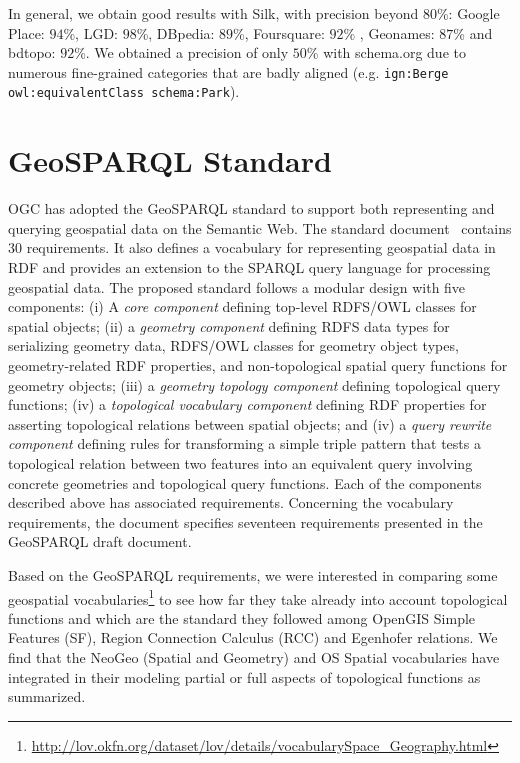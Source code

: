 \documentclass[a4paper,11pt]{report}
\begin{document}
In general, we obtain good results with Silk, with precision beyond $80$\%: Google Place: $94$\%, LGD: $98$\%, DBpedia: $89$\%, Foursquare: $92$\% , Geonames: $87$\% and bdtopo: $92$\%. We obtained a precision of only $50$\% with schema.org due to numerous fine-grained categories that are badly aligned (e.g. \texttt{ign:Berge owl:equivalentClass schema:Park}).



\section{GeoSPARQL Standard}
OGC has adopted the GeoSPARQL standard to support both representing and querying geospatial data on the Semantic Web. The standard document~\cite{ogc2012} contains 30 requirements. It also defines a vocabulary for representing geospatial data in RDF and provides an extension to the SPARQL query language for processing geospatial data. The proposed standard follows a modular design with five components: (i) A \textit{core component} defining top-level RDFS/OWL classes for spatial objects; (ii) a \textit{geometry component} defining RDFS data types for serializing geometry data, RDFS/OWL classes for geometry object types, geometry-related RDF properties, and non-topological spatial query functions for geometry objects; (iii) a \textit{geometry topology component} defining topological query functions; (iv) a \textit{topological vocabulary component} defining RDF properties for asserting topological relations between spatial objects; and (iv) a \textit{query rewrite component} defining rules for transforming a simple triple pattern that tests a topological relation between two features into an equivalent query involving concrete geometries and topological query functions. Each of the components described above has associated requirements. Concerning the vocabulary requirements, the document specifies seventeen requirements presented in the GeoSPARQL draft document.


Based on the GeoSPARQL requirements, we were interested in comparing some geospatial vocabularies\footnote{\url{http://lov.okfn.org/dataset/lov/details/vocabularySpace_Geography.html}} to see how far they take already into account topological functions and which are the standard they followed among OpenGIS Simple Features (SF), Region Connection Calculus (RCC) and Egenhofer relations. We find that the NeoGeo (Spatial and Geometry) and OS Spatial vocabularies have integrated in their modeling partial or full aspects of topological functions as summarized.
\end{document}

